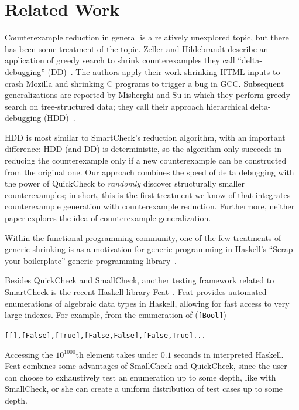 \documentclass{sigplanconf}
\newenvironment{code}{\begin{alltt}}{\end{alltt}}
\newcommand{\ttp}[1]{\texttt{#1}}
\begin{document}
 



\section{Related Work}\label{sec:related}

Counterexample reduction in general is a relatively unexplored topic, but there
has been some treatment of the topic.  Zeller and Hildebrandt describe an
application of greedy search to shrink counterexamples they call
``delta-debugging'' (DD)~\cite{dd}.  The authors apply their work shrinking HTML
inputs to crash Mozilla and shrinking C programs to trigger a bug in GCC.
Subsequent generalizations are reported by Misherghi and Su in which they
perform greedy search on tree-structured data; they call their approach
hierarchical delta-debugging (HDD)~\cite{hdd}.

HDD is most similar to SmartCheck's reduction algorithm, with an important
difference: HDD (and DD) is deterministic, so the algorithm only succeeds in
reducing the counterexample only if a new counterexample can be constructed from
the original one.  Our approach combines the speed of delta debugging with the
power of QuickCheck to \emph{randomly} discover structurally smaller
counterexamples; in short, this is the first treatment we know of that
integrates counterexample generation with counterexample reduction.
Furthermore, neither paper explores the idea of counterexample generalization.

Within the functional programming community, one of the few treatments of
generic shrinking is as a motivation for generic programming in Haskell's
``Scrap your boilerplate'' generic programming library~\cite{syb}.

Besides QuickCheck and SmallCheck, another testing framework related to
SmartCheck is the recent Haskell library Feat~\cite{feat}.  Feat provides
automated enumerations of algebraic data types in Haskell, allowing for fast
access to very large indexes.  For example, from the enumeration of
(\ttp{[Bool]})
%
\begin{code}
[[],[False],[True],[False,False],[False,True] ...
\end{code}
%
\noindent
Accessing the $10^{1000}$th element takes under $0.1$ seconds in interpreted
Haskell.  Feat combines some advantages of SmallCheck and QuickCheck, since the
user can choose to exhaustively test an enumeration up to some depth, like with
SmallCheck, or she can create a uniform distribution of test cases up to some
depth.
\end{document}
